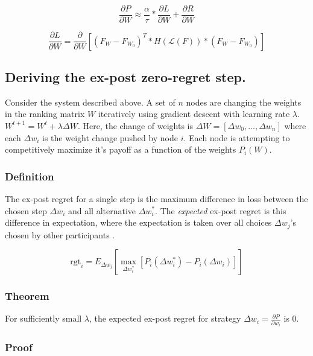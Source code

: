 \documentclass{article}
\begin{document}
\begin{equation}
\frac{\partial P}{\partial W} \approx \frac{\alpha}{\tau} * \frac{\partial L}{\partial W} + \frac{\partial R}{\partial W}
\end{equation}

\begin{equation}
\frac{\partial L}{\partial W} = \frac{\partial}{\partial W} [(F_W - F_{W_0})^T * H( \mathcal{L}(F)) * (F_W - F_{W_0})] 
\end{equation}
\smallskip


\subsection{Deriving the ex-post zero-regret step.}

Consider the system described above. A set of $n$ nodes are changing the weights in the ranking matrix $W$ iteratively using gradient descent with learning rate $\lambda$. $W^{t+1} = W^t + \lambda \Delta W$. Here, the change of weights is $\Delta W = [\Delta w_0, ... , \Delta w_n]$ where each $\Delta w_i$ is the weight change pushed by node $i$. Each node is attempting to competitively maximize it's payoff as a function of the weights $P_i(W)$.
\smallskip


\subsubsection{Definition}

The ex-post regret for a single step is the maximum difference in loss between the chosen step $\Delta w_i$ and all alternative $\Delta w_i^*$. The \textit{expected} ex-post regret is this difference in expectation, where the expectation is taken over all choices $\Delta w_j$'s chosen by other participants \cite{dtting2017optimal}.
\smallskip


\begin{equation}
\textrm{rgt}_i = E_{\Delta w_j} [ \max_{\Delta w_i^*} [P_i(\Delta w_i^*) - P_i(\Delta w_i)] ] 
\end{equation}

\subsubsection{Theorem}

For sufficiently small $\lambda$, the expected ex-post regret for strategy $\Delta w_i = \frac{\partial P}{\partial w_i}$ is 0.
\smallskip

\subsubsection{Proof}
\end{document}
